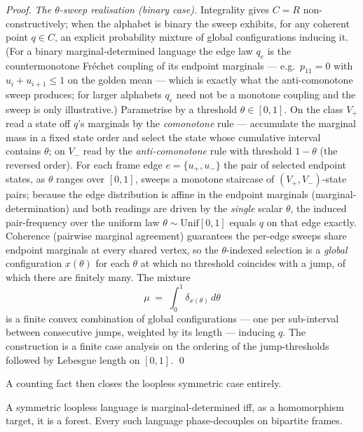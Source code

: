 \begin{proof}
\emph{The $\theta$-sweep realisation (binary case).} Integrality gives $C=R$
non-constructively; when the alphabet is binary the sweep exhibits, for any
coherent point $q\in C$, an explicit probability mixture of global configurations
inducing it. (For a binary marginal-determined language the edge law $q_e$ is the
countermonotone Fréchet coupling of its endpoint marginals --- e.g.\ $p_{11}=0$
with $u_i+u_{i+1}\le1$ on the golden mean --- which is exactly what the
anti-comonotone sweep produces; for larger alphabets $q_e$ need not be a monotone
coupling and the sweep is only illustrative.) Parametrise by a threshold
$\theta\in[0,1]$. On the class $V_+$ read a state off $q$'s marginals by the
\emph{comonotone} rule --- accumulate the marginal mass in a fixed state order
and select the state whose cumulative interval contains $\theta$; on $V_-$ read
by the \emph{anti-comonotone} rule with threshold $1-\theta$ (the reversed
order). For each frame edge $e=\{u_+,u_-\}$ the pair of selected endpoint states,
as $\theta$ ranges over $[0,1]$, sweeps a monotone staircase of $(V_+,V_-)$-state
pairs; because the edge distribution is affine in the endpoint marginals
(marginal-determination) and both readings are driven by the \emph{single}
scalar $\theta$, the induced pair-frequency over the uniform law
$\theta\sim\mathrm{Unif}[0,1]$ equals $q$ on that edge exactly. Coherence
(pairwise marginal agreement) guarantees the per-edge sweeps share endpoint
marginals at every shared vertex, so the $\theta$-indexed selection is a
\emph{global} configuration $x(\theta)$ for each $\theta$ at which no threshold
coincides with a jump, of which there are finitely many. The mixture
\[
  \mu \;=\; \int_0^1 \delta_{x(\theta)}\,d\theta
\]
is a finite convex combination of global configurations --- one per sub-interval
between consecutive jumps, weighted by its length --- inducing $q$. The
construction is a finite case analysis on the ordering of the jump-thresholds
followed by Lebesgue length on $[0,1]$. \qed
\end{proof}

A counting fact then closes the loopless symmetric case entirely.

\begin{theorem}\label{thm:forest}
A symmetric loopless language is marginal-determined iff, as a homomorphism
target, it is a forest. Every such language phase-decouples on bipartite frames.
\end{theorem}

